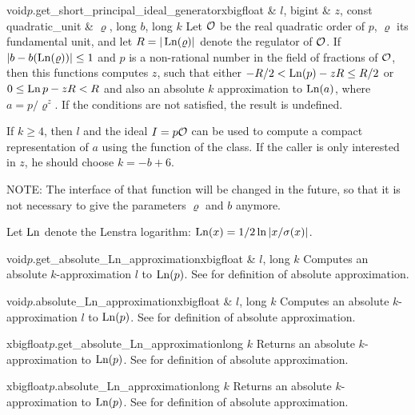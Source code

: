 \begin{fcode}{void}{$p$.get_short_principal_ideal_generator}{xbigfloat & $l$, bigint & $z$,
    const quadratic_unit & $\varrho$, long $b$, long $k$}%
  Let $\mathcal{O}$ be the real quadratic order of $p$, $\varrho$ its fundamental unit, and let $R =
  |\operatorname{Ln}(\varrho)|$ denote the regulator of $\mathcal{O}$.  If $|b - b(\operatorname{Ln}(\varrho))| \leq 1$ and $p$ is a
  non-rational number in the field of fractions of $\mathcal{O}$, then this functions computes $z$, such
  that either $-R/2 < \operatorname{Ln}(p) - z R \leq R/2$ or $0 \leq \operatorname{Ln} p - z R < R$ and also an absolute $k$
  approximation to $\operatorname{Ln}(a)$, where $a = p / \varrho^z$.  If the conditions are not satisfied,
  the result is undefined.
  
  If $k\geq 4$, then $l$ and the ideal $I = p \mathcal{O}$ can be used to compute a compact
  representation of $a$ using the  function of the class.  If the caller is only
  interested in $z$, he should choose $k = -b+6$.
  
  NOTE: The interface of that function will be changed in the future, so that it is not
  necessary to give the parameters $\varrho$ and $b$ anymore.
\end{fcode}



Let $\operatorname{Ln}$ denote the Lenstra logarithm: $\operatorname{Ln}(x) = 1/2 \ln |x / \sigma(x)|$.

\begin{cfcode}{void}{$p$.get_absolute_Ln_approximation}{xbigfloat & $l$, long $k$}  
  Computes an absolute $k$-approximation $l$ to $\operatorname{Ln}(p)$.  See  for definition of
  absolute approximation.
\end{cfcode}

\begin{cfcode}{void}{$p$.absolute_Ln_approximation}{xbigfloat & $l$, long $k$}
  Computes an absolute $k$-approximation $l$ to $\operatorname{Ln}(p)$.  See  for definition of
  absolute approximation.
\end{cfcode}

\begin{cfcode}{xbigfloat}{$p$.get_absolute_Ln_approximation}{long $k$}
  Returns an absolute $k$-approximation to $\operatorname{Ln}(p)$.  See  for definition of
  absolute approximation.
\end{cfcode}

\begin{cfcode}{xbigfloat}{$p$.absolute_Ln_approximation}{long $k$}
  Returns an absolute $k$-approximation to $\operatorname{Ln}(p)$.  See  for definition of
  absolute approximation.
\end{cfcode}

